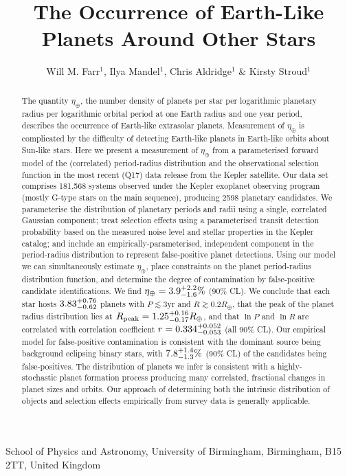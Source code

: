 \documentclass{nature}
\newcommand{\etaearth}{\eta_\oplus}
\newcommand{\Rpeak}{R_\mathrm{peak}}
\newcommand{\REarth}{R_\oplus}
\begin{document}
\title{The Occurrence of Earth-Like Planets Around Other Stars}

\author{Will M. Farr$^{1}$, Ilya Mandel$^{1}$, Chris Aldridge$^{1}$ \& Kirsty Stroud$^{1}$}

\maketitle

\begin{affiliations}
\item School of Physics and Astronomy, University of Birmingham, Birmingham, B15 2TT, United Kingdom
\end{affiliations}

\begin{abstract}
  The quantity $\etaearth$, the number density of planets per star per
  logarithmic planetary radius per logarithmic orbital period at one
  Earth radius and one year period, describes the occurrence of
  Earth-like extrasolar planets.  Measurement of $\etaearth$ is
  complicated by the difficulty of detecting Earth-like planets in
  Earth-like orbits about Sun-like stars.  Here we present
  a measurement of $\etaearth$ from a parameterised forward model of
  the (correlated) period-radius distribution and the observational
  selection function in the most recent (Q17) data release from the
  Kepler satellite\cite{Borucki2010,Borucki2011,Batalha2013}.  Our
  data set comprises 181,568 systems observed under the Kepler
  exoplanet observing program (mostly G-type stars on the main
  sequence\cite{Batalha2010}), producing 2598 planetary candidates.
  We parameterise the distribution of planetary periods and radii
  using a single, correlated Gaussian component; treat selection
  effects using a parameterised transit detection probability based on
  the measured noise level and stellar properties in the Kepler
  catalog; and include an empirically-parameterised, independent
  component in the period-radius distribution to represent
  false-positive planet detections.  Using our model we can
  simultaneously estimate $\etaearth$, place constraints on the planet
  period-radius distribution function, and determine the degree of
  contamination by false-positive candidate identifications.  We find
  $\etaearth = \earange$ (90\% CL).  We conclude that each star hosts
  $3.83_{-0.62}^{+0.76}$ planets with $P \lesssim 3 \mathrm{yr}$ and $R \gtrsim
  0.2 \REarth$, that the peak of the planet radius distribution lies
  at $\Rpeak = \rpeakrange \REarth$, and that $\ln P$ and $\ln R$ are
  correlated with correlation coefficient $r = 0.334_{-0.053}^{+0.052}$ (all
  90\% CL).  Our empirical model for false-positive contamination is
  consistent with the dominant source being background eclipsing
  binary stars\cite{Fressin2013}, with $7.8_{-1.3}^{+1.4}\%$ (90\% CL) of the
  candidates being false-positives.  The distribution of planets we
  infer is consistent with a highly-stochastic planet formation
  process producing many correlated, fractional changes in planet
  sizes and orbits.  Our approach of determining both the intrinsic
  distribution of objects and selection effects empirically from
  survey data is generally applicable.
\end{abstract}
\end{document}
